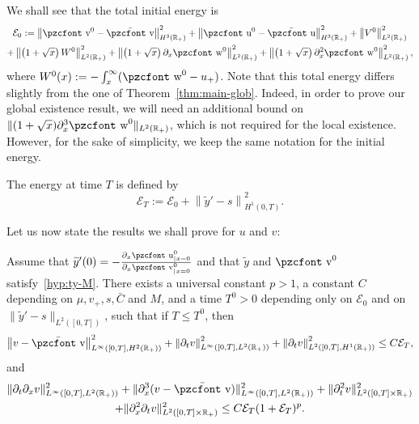 \documentclass[10pt]{amsart}
\theoremstyle{definition}\newtheorem{defi}[theo]{Definition}\newtheorem{rema}[theo]{Remark}\newtheorem{exam}[theo]{Example}\newtheorem{exem}[theo]{Example}\newtheorem{nota}[theo]{Notation}
\newcommand{\mathpzc}[1]{\text{\pzcfont #1}}
\newcommand{\R}{\mathbb{R}}
\newcommand{\p}{\partial}
\newcommand{\bv}{\bar{\mathpzc{v}}}
\newcommand{\bu}{\bar{\mathpzc{u}}}
\newcommand{\cE}{\mathcal E}
\newcommand{\tv}{\mathpzc{v}}
\newcommand{\tu}{\mathpzc{u}}
\newcommand{\tw}{\mathpzc{w}}
\newcommand{\ty}{\widetilde{y}}
\begin{document}
We shall see that the total initial energy is
\begin{multline}\label{def:E0}
\cE_0:=\left\|\tv^0 - \bv\right\|_{H^3(\R_+)}^2 + \left\|\tu^0-\bu\right\|_{H^3(\R_+)}^2 +\left\|V^0\right\|_{L^2(\R_+)}^2 \\
+ \left\|\left(1+\sqrt{x}\right) W^0\right\|_{L^2(\R_+)}^2 + \left\|\left(1+\sqrt{x}\right) \p_x\tw^0\right\|_{L^2(\R_+)}^2 + \left\|\left(1+\sqrt{x}\right)\partial_x^2\tw^0\right\|_{L^2(\R_+)}^2,
\end{multline}
where $W^0(x):=-\int_x^\infty (\tw^0-u_+)$. {Note that this total energy differs slightly from the one of Theorem~\ref{thm:main-glob}. Indeed, in order to prove our global existence result, we will need an additional bound on $\|(1+\sqrt{x})\partial_x^3\tw^0\|_{L^2(\R_+)}$, which is not required for the local existence. However, for the sake of simplicity, we keep the same notation for the initial energy.}


The energy at time $T$ is defined by
\begin{equation}\label{def:ET}
\cE_T:=\cE_0 + \left\|\ty'-s\right\|_{H^1(0,T)}^2.
\end{equation}


Let us now state the results we shall prove for $u$ and $v$:

\begin{prop}\label{cor:recap-est-v}
Assume that $\ty'(0)=-\frac{\p_x \tu^0_{|x=0}}{\p_x \tv^0_{|x=0}}$ and that $\ty$ and $\tv^0$ satisfy~\eqref{hyp:ty-M}. There exists a universal constant $p>1$, a constant $C$ depending on $\mu, v_+, s, \bar C$ and $M$, and a time $T^0>0$ depending only on $\cE_0$ and on $\|\ty'-s\|_{L^2([0,T])}$, such that if $T\leq T^0$, then
\begin{align*}
\left\|v-\bv\right\|_{L^\infty\left([0,T], H^2(\R_+)\right)}^2 + \left\|\p_t v\right\|_{L^\infty\left([0,T], L^2(\R_+)\right)}^2 + \left\|\p_t v\right\|_{L^2\left([0,T], H^1(\R_+)\right)}^2
\leq C \cE_T,
\end{align*}
and
\begin{multline*}
\|\p_t \p_x v\|_{L^\infty([0,T], L^2(\R_+))}^2 + \| \p_x^3(v-\bv)\|_{L^\infty([0,T], L^2(\R_+))}^2 + \| \p_t^2 v\|_{L^2([0,T]\times \R_+)}^2
\\ + \|\p_x^2 \p_t v\|_{L^2([0,T]\times \R_+)}^2
\leq C \cE_T (1+ \cE_T)^p.
\end{multline*}
\end{prop}
\end{document}
